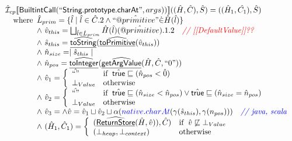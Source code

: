 \[\begin{array}{l}
\hat{\mathcal{I}} _{cp}\llbracket \mbox{\textsf{BuiltintCall}}(``\mbox{\textsf{String.prototype.charAt}}",args))\rrbracket((\hat{H},\hat{C}), \hat{S})
  = ((\hat{H}_1, \hat{C_1}), \hat{S})\\
\quad{\rm where}\begin{array}[t]{l}     
  \hat{L}_{prim} = \{ \hat{l} \mid \hat{l} \in \hat{C}.2 \land ``\hat{@primitive}" \dot{\in}\hat{H}(\hat{l}) \}\\
  \land\ \hat{v}_{this} = \bigsqcup_{\hat{l} \in \hat{L}_{prim}} \hat{H}(\hat{l})(\hat{@primitive}).1.2
    \quad\textit{{\color{red}// [[DefaultValue]]??}}\\
  \land\ \hat{s}_{this} = \widehat{\underline{\sf toString}}(\widehat{\underline{\sf toPrimitive}}(\hat{v}_{this}))\\
  \land\ \hat{n}_{size} = \mid \hat{s}_{this} \mid\\
  \land\ \hat{n}_{pos} = \widehat{\underline{\sf toInteger}}(\widehat{\underline{\sf getArgValue}}(\hat{H}, \hat{C}, ``0"))\\
  \land\ \hat{v}_1 =  \left\{\begin{array}{ll}
      \hat{``"} & {\rm if}\begin{array}[t]{l}\hat{\mbox{\textsf{true}}} \sqsubseteq (\hat{n}_{pos} < \hat{0})\end{array}\\
      \bot_{Value} & {\rm otherwise}\\
    \end{array}\right.\\
  \land\ \hat{v}_2 =  \left\{\begin{array}{ll}
      \hat{``"}
      & {\rm if}\begin{array}[t]{l}\hat{\mbox{\textsf{true}}} \sqsubseteq (\hat{n}_{size} < \hat{n}_{pos}) 
        \lor \hat{\mbox{\textsf{true}}} \sqsubseteq (\hat{n}_{size} = \hat{n}_{pos}) \end{array}\\
      \bot_{Value} & {\rm otherwise}\\
    \end{array}\right.\\
  \land\ \hat{v}_3 = 
  \land \hat{v} = \hat{v}_1 \sqcup \hat{v}_2 \sqcup \alpha({\color{blue} native.charAt}(\gamma(\hat{s}_{this}),\gamma(n_{pos})))\quad\textit{{\color{blue}// java, scala}}\\  
  \land\ (\hat{H}_1, \hat{C}_1) = 
    \left\{\begin{array}{ll}
      (\widehat{\underline{\sf ReturnStore}}(\hat{H}, \hat{v})), \hat{C})
      & {\rm if}\begin{array}[t]{l}\hat{v} \not\sqsubseteq \bot_{Value}\end{array}\\
      (\bot_{heap}, \bot_{context}) & {\rm otherwise} \\
    \end{array}\right.\\
  \end{array}\\
\\\\



\end{array}\]
